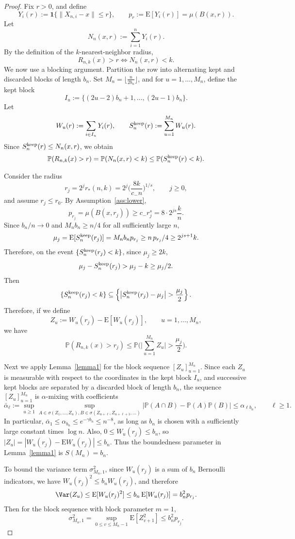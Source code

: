 \documentclass[12pt]{article}
\def\E{{\mathrm E}}
\theoremstyle{definition}
\begin{document}
\begin{proof}

Fix \(r>0\), and define
\[
Y_i(r):=\mathbf 1\{\|X_{n,i}-x\|\le r\},
\qquad
p_r:=\E[Y_i(r)]=\mu(B(x,r)).
\]
Let
\[
N_n(x,r):=\sum_{i=1}^n Y_i(r).
\]
By the definition of the \(k\)-nearest-neighbor radius,
\[
R_{n,k}(x)>r
\iff N_n(x,r)<k.
\]
We now use a blocking argument. Partition the row into alternating kept and discarded blocks of length \(b_n\). Set $M_n=\lfloor \frac{n}{2b_n}\rfloor$, and for \(u=1,\dots,M_n\), define the kept block
\[
I_u:=\{(2u-2)b_n+1,\dots,(2u-1)b_n\}.
\]
Let
\[
W_u(r):=\sum_{i\in I_u}Y_i(r),
\qquad
S_n^{\rm keep}(r):=\sum_{u=1}^{M_n}W_u(r).
\]
Since \(S_n^{\rm keep}(r)\le N_n(x,r)\), we obtain
\[
\mathbb P(R_{n,k}(x)>r)
=
\mathbb P(N_n(x,r)<k)
\le
\mathbb P(S_n^{\rm keep}(r)<k).
\]

Consider the radius
\[
r_j=2^j r_*(n,k)
=
2^j\Big(\frac{8k}{c_- n}\Big)^{1/s},
\qquad j\ge 0,
\]
and assume \(r_j\le r_0\). By Assumption~\ref{ass:lower},
\[
p_{r_j}
=
\mu(B(x,r_j))
\ge c_- r_j^s
=
8\cdot2^{js}\frac{k}{n}.
\]
Since $b_n/n \to 0$ and $M_n b_n \ge n/4$ for all sufficiently large $n$,
\[
\mu_j=\E[S_n^{\rm keep}(r_j)]
=
M_n b_n p_{r_j}
\ge n\,p_{r_j}/4
\ge
2^{js+1}k.
\]
Therefore, on the event \(\{S_n^{\rm keep}(r_j)<k\}\), since $\mu_j\ge 2k$,
\[
\mu_j-S_n^{\rm keep}(r_j)>\mu_j-k\ge \mu_j/2.
\]
Then
\[
\{S_n^{\rm keep}(r_j)<k\}
\subseteq
\left\{
\left|S_n^{\rm keep}(r_j)-\mu_j\right|>\frac{\mu_j}{2}
\right\}.
\]
Therefore, if we define
\[
Z_u:=W_u(r_j)-\E[W_u(r_j)],
\qquad u=1,\dots,M_n,
\]
we have
\[
\mathbb P(R_{n,k}(x)>r_j)
\le
\mathbb P\Big(\Big|\sum_{u=1}^{M_n}Z_u\Big|>\frac{\mu_j}{2}\Big).
\]

Next we apply Lemma~\ref{lemma1} for the block sequence \([Z_u]_{u=1}^{M_n}\). Since each \(Z_u\) is measurable with respect to the coordinates in the kept block \(I_u\), and successive kept blocks are separated by a discarded block of length \(b_n\), the sequence \([Z_u]_{u=1}^{M_n}\) is \(\alpha\)-mixing with coefficients
\[
\bar\alpha_\ell
:=
\sup_{u\ge 1}\sup_{A\in\sigma(Z_1,\dots,Z_u),B\in\sigma(Z_{u+\ell},Z_{u+\ell+1},\dots)}
|\mathbb P(A\cap B)-\mathbb P(A)\mathbb P(B)|
\le
\alpha_{\ell b_n},
\qquad \ell\ge 1.
\]
In particular, $\bar\alpha_1\le \alpha_{b_n}\le e^{-\gamma b_n}\le n^{-8}$, as long as \(b_n\) is chosen with a sufficiently large constant times \(\log n\). Also, $0\le W_u(r_j)\le b_n$, so $|Z_u| = |W_u(r_j)-\E W_u(r_j)| \le b_n$. Thus the boundedness parameter in Lemma~\ref{lemma1} is $S(M_n)=b_n$.

To bound the variance term \(\sigma^2_{M_n,1}\), since \(W_u(r_j)\) is a sum of \(b_n\) Bernoulli indicators, we have $W_u(r_j)^2\le b_n W_u(r_j)$, and therefore
\[
\Var(Z_u)
\le \E[W_u(r_j)^2]
\le b_n\,\E[W_u(r_j)]
=
b_n^2 p_{r_j}.
\]
Then for the block sequence with block parameter \(m=1\),
\[
\sigma^2_{M_n,1}
=
\sup_{0\le v\le M_n-1}\E[Z_{v+1}^2]
\le
b_n^2 p_{r_j}.
\]


\end{proof}
\end{document}
